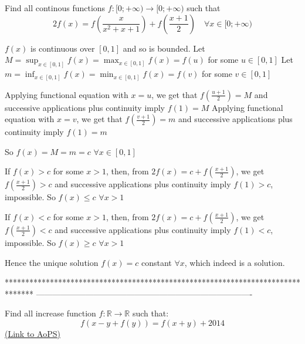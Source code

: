\begin{solution}
	\begin{tcolorbox}Find all continous functions $f:[0;+\infty )\to [0;+\infty )$ such that
\[2f(x)=f(\frac{x}{x^{2}+x+1})+f(\frac{x+1}{2})\quad\forall x\in [0;+\infty )\]\end{tcolorbox}
$f(x)$ is continuous over $[0,1]$ and so is bounded.
Let $M=\sup_{x\in[0,1]}f(x)=\max_{x\in[0,1]}f(x)=f(u)$ for some $u\in[0,1]$
Let $m=\inf_{x\in[0,1]}f(x)=\min_{x\in[0,1]}f(x)=f(v)$ for some $v\in[0,1]$

Applying functional equation with $x=u$, we get that $f(\frac{u+1}2)=M$ and successive applications plus continuity imply $f(1)=M$
Applying functional equation with $x=v$, we get that $f(\frac{v+1}2)=m$ and successive applications plus continuity imply $f(1)=m$

So $f(x)=M=m=c$ $\forall x\in[0,1]$

If $f(x)>c$ for some $x>1$, then, from $2f(x)=c+f(\frac {x+1}2)$, we get $f(\frac {x+1}2)>c$ and successive applications plus continuity imply $f(1)>c$, impossible.
So $f(x)\le c$ $\forall x>1$

If $f(x)<c$ for some $x>1$, then, from $2f(x)=c+f(\frac {x+1}2)$, we get $f(\frac {x+1}2)<c$ and successive applications plus continuity imply $f(1)<c$, impossible.
So $f(x)\ge c$ $\forall x>1$

Hence the unique solution $\boxed{f(x)=c}$ constant $\forall x$, which indeed is a solution.
\end{solution}
*******************************************************************************
-------------------------------------------------------------------------------

\begin{problem}
	Find all increase function $f:\mathbb{R}\rightarrow \mathbb{R}$ such that:
\[f(x-y+f(y))=f(x+y)+2014\]
	\flushright \href{https://artofproblemsolving.com/community/c6h568855}{(Link to AoPS)}
\end{problem}



